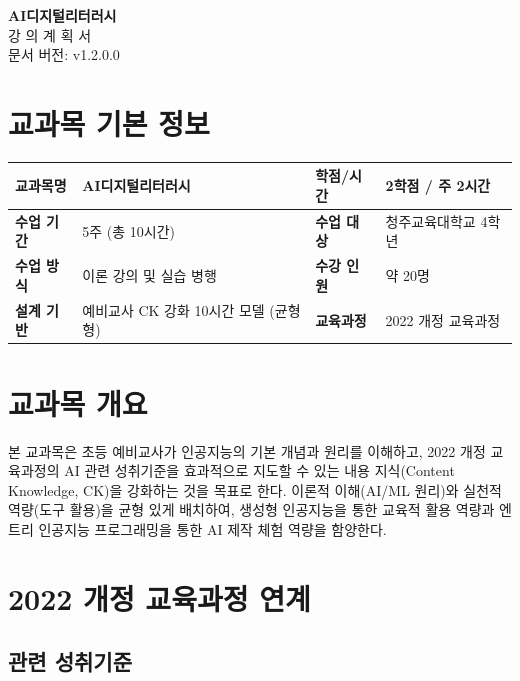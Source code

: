 \documentclass[a4paper,11pt]{article}
\begin{document}
\begin{center}
{\LARGE\bfseries AI디지털리터러시}\\[0.8em]
{\Large 강 의 계 획 서}\\[0.5em]
{\normalsize 문서 버전: v1.2.0.0}
\end{center}
\vspace{1em}
\tableofcontents
\newpage

\section{교과목 기본 정보}

\noindent
\begin{tabularx}{\textwidth}{|>{\centering\bfseries\arraybackslash}p{2.3cm}|X|>{\centering\bfseries\arraybackslash}p{2.3cm}|X|}
\hline
교과목명 & AI디지털리터러시 & 학점/시간 & 2학점 / 주 2시간 \\ \hline
수업 기간 & 5주 (총 10시간) & 수업 대상 & 청주교육대학교 4학년 \\ \hline
수업 방식 & 이론 강의 및 실습 병행 & 수강 인원 & 약 20명 \\ \hline
설계 기반 & 예비교사 CK 강화 10시간 모델 (균형형) & 교육과정 & 2022 개정 교육과정 \\ \hline
\end{tabularx}

\section{교과목 개요}

본 교과목은 초등 예비교사가 인공지능의 기본 개념과 원리를 이해하고, 2022 개정 교육과정의 AI 관련 성취기준을 효과적으로 지도할 수 있는 내용 지식(Content Knowledge, CK)을 강화하는 것을 목표로 한다. 이론적 이해(AI/ML 원리)와 실천적 역량(도구 활용)을 균형 있게 배치하여, 생성형 인공지능을 통한 교육적 활용 역량과 엔트리 인공지능 프로그래밍을 통한 AI 제작 체험 역량을 함양한다.

\section{2022 개정 교육과정 연계}
\subsection{관련 성취기준}
\end{document}
